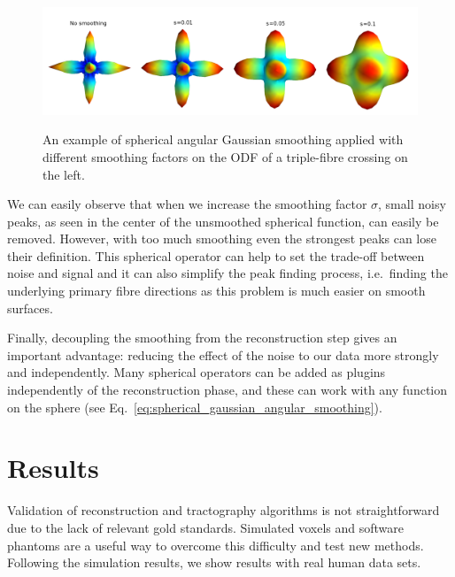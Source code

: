 \documentclass{bioinfo}
\begin{document}
\begin{methods}
%
\begin{figure}
\begin{centering}
\includegraphics[scale=0.2]{figures/triple_crossing_laplacian_snr20}
\par\end{centering}

\caption{An example of spherical angular Gaussian smoothing applied with different
smoothing factors on the ODF of a triple-fibre crossing on the left. }


\centering{}\label{Flo:Smoothing_Example}
\end{figure}

We can easily observe that when we increase the smoothing factor $\sigma$,
small noisy peaks, as seen in the center of the unsmoothed spherical
function, can easily be removed. However, with too much smoothing
even the strongest peaks can lose their definition. This spherical
operator can help to set the trade-off between noise and signal and
it can also simplify the peak finding process, i.e.~finding the underlying
primary fibre directions as this problem is much easier on smooth
surfaces.

Finally, decoupling the smoothing from the reconstruction step gives
an important advantage: reducing the effect of the noise to our data
more strongly and independently. Many spherical operators can be added
as plugins independently of the reconstruction phase, and these can
work with any function on the sphere (see Eq.~\ref{eq:spherical_gaussian_angular_smoothing}).


\end{methods}

\section{Results}

Validation of reconstruction and tractography algorithms is not straightforward
due to the lack of relevant gold standards. Simulated voxels and software
phantoms are a useful way to overcome this difficulty and test new
methods. Following the simulation results, we show results with real
human data sets.
\end{document}
